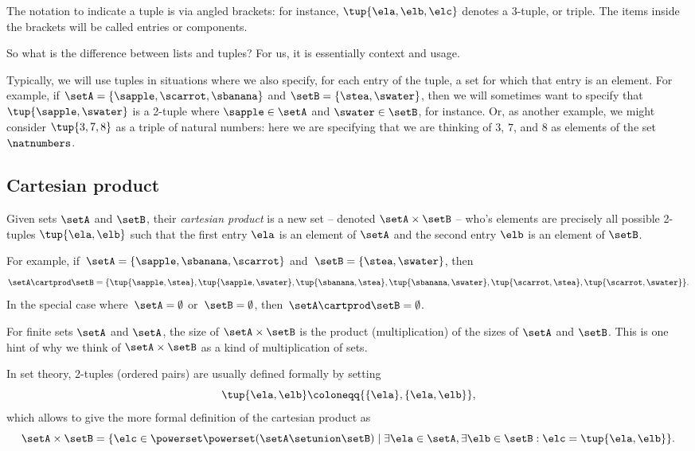 The notation to indicate a tuple is via angled brackets: for instance, $\tup{\ela, \elb, \elc}$ denotes a 3-tuple, or triple. The items inside the brackets will be called entries or components. 

So what is the difference between lists and tuples? For us, it is essentially context and usage. 

Typically, we will use tuples in situations where we also specify, for each entry of the tuple, a set for which that entry is an element. For example, if $\setA = \{ \sapple, \scarrot, \sbanana \}$ and $\setB = \{ \stea, \swater \}$, then we will sometimes want to specify that $\tup{\sapple, \swater}$ is a 2-tuple where $\sapple \in \setA$ and $\swater \in \setB$, for instance. Or, as another example, we might consider $\tup{3, 7, 8}$ as a triple of natural numbers: here we are specifying that we are thinking of $3$, $7$, and $8$ as elements of the set $\natnumbers$. 

\subsection{Cartesian product}\label{sec:cartesian-product}

Given sets $\setA$ and $\setB$, their \emph{cartesian product} is a new set -- denoted $\setA \times \setB$ -- who's elements are precisely all possible 2-tuples $\tup{\ela, \elb}$ such that the first entry $\ela$ is an element of $\setA$ and the second entry $\elb$ is an element of $\setB$. 

For example, if~$\setA = \{ \sapple, \sbanana, \scarrot\}$ and~$\setB = \{ \stea, \swater \}$, then
\begin{equation*}
    \setA \cartprod \setB = \{ \tup{\sapple, \stea}, \tup{\sapple, \swater}, \tup{\sbanana, \stea}, \tup{\sbanana, \swater},  \tup{\scarrot, \stea}, \tup{\scarrot, \swater}\}.
\end{equation*}
In the special case where~$\setA = \emptyset$ or~$\setB = \emptyset$, then~$\setA \cartprod \setB = \emptyset$.


\begin{remark}
For finite sets $\setA$ and $\setA$, the size of $\setA \times \setB$ is the product (multiplication) of the sizes of $\setA$ and $\setB$. This is one hint of why we think of $\setA \times \setB$ as a kind of multiplication of sets. 
\end{remark}

In set theory, 2-tuples (ordered pairs) are usually defined formally by setting
\begin{equation}
    \label{eq:ordered-pair}
    \tup{\ela, \elb} \coloneqq \{ \{\ela \} , \{ \ela, \elb \} \},
\end{equation}
which allows to give the more formal definition of the cartesian product as
            \begin{equation}
                \setA \times \setB = \{ \elc \in \powerset \powerset (\setA \setunion \setB) \mid \exists \ela \in \setA, \exists \elb \in \setB : \elc = \tup{\ela, \elb} \}.
            \end{equation}

